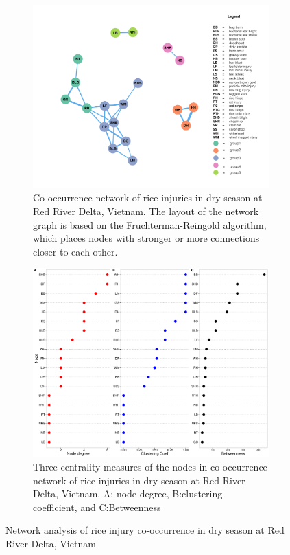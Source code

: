 \begin{figure}
    \centering
    \begin{subfigure}[b]{1\textwidth}
        \includegraphics[width = 1\textwidth]{figures/networkRR_ds/networkRR_ds.pdf}
        \caption{Co-occurrence network of rice injuries in dry season at Red River Delta, Vietnam. The layout of the network graph is based on the Fruchterman-Reingold algorithm, which places nodes with stronger or more connections closer to each other.}
        \label{fig:networkRR_ds}
    \end{subfigure}
    \begin{subfigure}[b]{1\textwidth}
        \includegraphics[width = 1\textwidth]{figures/nodepropRR_ds/nodepropRR_ds.pdf}
        \caption{Three centrality measures of the nodes in co-occurrence network of rice injuries in dry season at Red River Delta, Vietnam. A: node degree, B:clustering coefficient, and C:Betweenness}
        \label{fig:nodepropRR_ds}
    \end{subfigure}
    \caption{Network analysis of rice injury co-occurrence in dry season at Red River Delta, Vietnam}
    \label{fig:RR_ds}
\end{figure}

